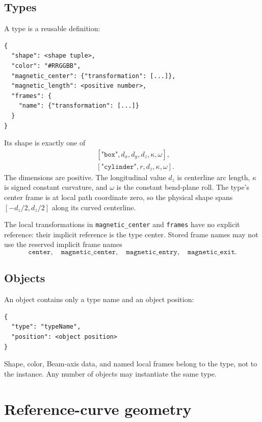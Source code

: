 \documentclass[11pt,a4paper]{article}
\begin{document}
\subsection{Types}

A type is a reusable definition:
\begin{lstlisting}
{
  "shape": <shape tuple>,
  "color": "#RRGGBB",
  "magnetic_center": {"transformation": [...]},
  "magnetic_length": <positive number>,
  "frames": {
    "name": {"transformation": [...]}
  }
}
\end{lstlisting}
Its shape is exactly one of
\begin{align*}
  &[\texttt{"box"},d_x,d_y,d_z,\kappa,\omega],\\
  &[\texttt{"cylinder"},r,d_z,\kappa,\omega].
\end{align*}
The dimensions are positive.  The longitudinal value $d_z$ is centerline arc
length, $\kappa$ is signed constant curvature, and $\omega$ is the constant
bend-plane roll.  The type's center frame is at local path coordinate zero, so
the physical shape spans $[-d_z/2,d_z/2]$ along its curved centerline.

The local transformations in \texttt{magnetic\_center} and \texttt{frames}
have no explicit reference: their implicit reference is the type center.
Stored frame names may not use the reserved implicit frame names
\begin{equation}
  \texttt{center},\quad
  \texttt{magnetic\_center},\quad
  \texttt{magnetic\_entry},\quad
  \texttt{magnetic\_exit}.
\end{equation}

\subsection{Objects}

An object contains only a type name and an object position:
\begin{lstlisting}
{
  "type": "typeName",
  "position": <object position>
}
\end{lstlisting}
Shape, color, Beam-axis data, and named local frames belong to the type, not to
the instance.  Any number of objects may instantiate the same type.

\section{Reference-curve geometry}
\label{sec:curve-geometry}
\end{document}
